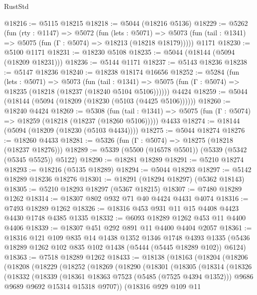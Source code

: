 \begin{lexlean}{RustStd}
\begin{coremodule}
@18216 := @5115 @18215
@18218 := @5044 (@18216 @5136)
@18229 := @5262
    (fun (rty : @1147) =>
    @5072
      (fun (lets : @5071) =>
      @5073 (fun (tail : @1341) => @5075 (fun (Γ : @5074) => @18213 (@18218 @18179)))))
    @1171
@18230 := @5100 @1171
@18231 := @18230 @5108
@18235 := @5044 (@18144 (@5094 (@18209 @18231)))
@18236 := @5144 @1171
@18237 := @5143 @18236
@18238 := @5147 @18236
@18240 := @18238 @18174 @16656
@18252 := @5284
    (fun (lets : @5071) =>
    @5073
      (fun (tail : @1341) =>
      @5075 (fun (Γ : @5074) => @18235 (@18218 (@18237 (@18240 @5104 @5106))))))
    @4424
@18259 := @5044 (@18144 (@5094 (@18209 (@18230 (@5103 (@4425 @5106))))))
@18260 := @18240 @4424
@18269 := @5308
    (fun (tail : @1341) => @5075 (fun (Γ : @5074) => @18259 (@18218 (@18237 (@18260 @5106)))))
    @4433
@18274 := @18144 (@5094 (@18209 (@18230 (@5103 @4434))))
@18275 := @5044 @18274
@18276 := @18260 @4433
@18281 := @5326 (fun (Γ : @5074) => @18275 (@18218 (@18237 @18276)))
@18289 := @5339 (@5500 (@16578 @5501)) (@5339 (@5342 (@5345 @5525)) @5122)
@18290 := @18281 @18289
@18291 := @5210 @18274
@18293 := @18216 (@5135 @18289)
@18294 := @5044 @18293
@18297 := @5142 @18289 @18236 @18276
@18301 := @18291 (@18294 @18297) (@5362 @18143)
@18305 := @5210 @18293 @18297 (@5367 @18215)
@18307 := @7480 @18289 @1262
@18314 := @18307 @802 @932 @71 @40 @4424 @4431 @4074
@18316 := @7493 @18289 @1262
@18326 := @18316 @453 @931 @11 @15 @4408 @4423 @4430 @1748 @4385 @1335
@18332 := @6093 @18289 @1262 @453 @11 @4400 @4406
@18339 := @18307 @451 @292 @891 @11 @4400 @4404 @2057
@18361 := @18316
    @121
    @109
    @835
    @14
    @1438
    @1352
    @1346
    @1748
    @4393
    @1335
    (@5436 @18289 @1262 @102 @835 @102 @1438 (@5444 (@5445 @18289 @102)) @6124)
@18363 := @7518 @18289 @1262
@18433 := @18138
    (@18163
      (@18204
        (@18206
          (@18208
            (@18229
              (@18252
                (@18269
                  (@18290
                    (@18301
                      (@18305
                        (@18314
                          (@18326
                            (@18332
                              (@18339
                                (@18361 @18363 @7523 (@5485 (@7525 @4394 @1352)))
                                @9686
                                @9689
                                @9692
                                @15314
                                @15318
                                @9707))
                            (@18316
                              @929
                              @109
                              @11

\end{coremodule}
\end{lexlean}
